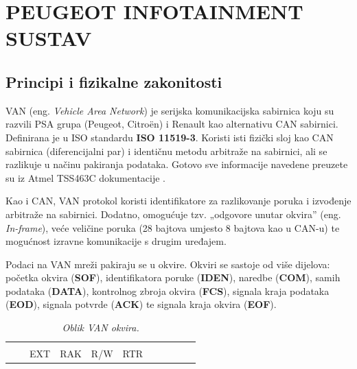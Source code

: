 \newpage
\section{PEUGEOT INFOTAINMENT SUSTAV}\label{sec:van_bus}

\subsection{Principi i fizikalne zakonitosti}
VAN (eng. \textit{Vehicle Area Network}) je serijska komunikacijska sabirnica koju su razvili PSA grupa (Peugeot, Citroën) i Renault kao alternativu CAN sabirnici. 
Definirana je u ISO standardu \textbf{ISO 11519-3}. 
Koristi isti fizički sloj kao CAN sabirnica (diferencijalni par) i identičnu metodu arbitraže na sabirnici, 
ali se razlikuje u načinu pakiranja podataka.
Gotovo sve informacije navedene preuzete su iz Atmel TSS463C dokumentacije \cite{tss463c_datasheet}.

\bigskip
\noindent
Kao i CAN, VAN protokol koristi identifikatore za razlikovanje poruka i izvođenje arbitraže na sabirnici. 
Dodatno, omogućuje tzv. „odgovore unutar okvira” (eng. \textit{In-frame}), veće veličine poruka (28 bajtova umjesto 8 bajtova kao u CAN-u) te mogućnost izravne komunikacije s drugim uređajem.

\bigskip
\noindent
Podaci na VAN mreži pakiraju se u okvire. 
Okviri se sastoje od više dijelova: početka okvira (\textbf{SOF}), identifikatora poruke (\textbf{IDEN}), 
naredbe (\textbf{COM}), samih podataka (\textbf{DATA}), kontrolnog zbroja okvira (\textbf{FCS}), 
signala kraja podataka (\textbf{EOD}), signala potvrde (\textbf{ACK}) te signala kraja okvira (\textbf{EOF}).

\begin{table}[H]
    \caption{\textit{Oblik VAN okvira.}}
    \centering
    \fontsize{10}{10}
    \selectfont
    \begin{tabular}{|c|c|c|c|c|c|c|c|c|c|c|}
        \hline
          &  &  &  &  &  &  &  \\[7mm] 
         &  & EXT & RAK & R/W & RTR &  &  &  &  & \\
        \hline
    \end{tabular}
    \label{fig:van_frame_format}
\end{table}

